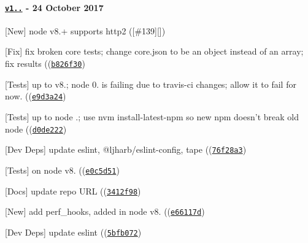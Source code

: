 \paragraph*{\href{https://github.com/browserify/resolve/compare/v1.4.0...v1.5.0}{\tt v1..} -\/ 24 October 2017}


\begin{DoxyItemize}
\item \mbox{[}New\mbox{]} node v8.+ supports {\ttfamily http2} (\mbox{[}{\ttfamily \#139}\mbox{]}\mbox{[}\mbox{]})
\item \mbox{[}Fix\mbox{]} fix broken core tests; change core.\+json to be an object instead of an array; fix results ((\href{https://github.com/browserify/resolve/commit/b826f3007dc8903b95e39984f93c68bb5e4c85b9}{\tt {\ttfamily b826f30}})
\item \mbox{[}Tests\mbox{]} up to {\ttfamily v8.}; node 0. is failing due to travis-\/ci changes; allow it to fail for now. ((\href{https://github.com/browserify/resolve/commit/e9d3a24ae0a4d8e3eefc6431c918c23f7c8fc6d3}{\tt {\ttfamily e9d3a24}})
\item \mbox{[}Tests\mbox{]} up to {\ttfamily node} {.}; use {\ttfamily nvm install-\/latest-\/npm} so new npm doesn’t break old node ((\href{https://github.com/browserify/resolve/commit/d0de222e4b55b67224ddec0421ee66ce8cb5ee8d}{\tt {\ttfamily d0de222}})
\item \mbox{[}Dev Deps\mbox{]} update {\ttfamily eslint}, {\ttfamily @ljharb/eslint-\/config}, {\ttfamily tape} ((\href{https://github.com/browserify/resolve/commit/76f28a3d275a63b0511449d28900ab5749f27fa5}{\tt {\ttfamily 76f28a3}})
\item \mbox{[}Tests\mbox{]} on {\ttfamily node} {\ttfamily v8.} ((\href{https://github.com/browserify/resolve/commit/e0c5d518abfaadc4107ca8f3f8c30caf46490444}{\tt {\ttfamily e0c5d51}})
\item \mbox{[}Docs\mbox{]} update repo U\+RL ((\href{https://github.com/browserify/resolve/commit/3412f984a03a345b9a5ef1f0642a0308d676a2c2}{\tt {\ttfamily 3412f98}})
\item \mbox{[}New\mbox{]} add {\ttfamily perf\+\_\+hooks}, added in node v8. ((\href{https://github.com/browserify/resolve/commit/e66117df49d9f967b46fde633770307c9d5a7066}{\tt {\ttfamily e66117d}})
\item \mbox{[}Dev Deps\mbox{]} update {\ttfamily eslint} ((\href{https://github.com/browserify/resolve/commit/5bfb072f152c77c8247f4c06c1efa9246bbdddb0}{\tt {\ttfamily 5bfb072}})
\end{DoxyItemize}

